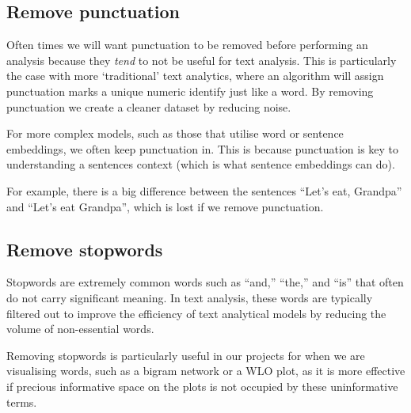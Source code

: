 \documentclass[
  letterpaper,
  DIV=11,
  numbers=noendperiod]{scrreprt}
\begin{document}
\subsection{Remove punctuation}\label{remove-punctuation}

Often times we will want punctuation to be removed before performing an
analysis because they \emph{tend} to not be useful for text analysis.
This is particularly the case with more `traditional' text analytics,
where an algorithm will assign punctuation marks a unique numeric
identify just like a word. By removing punctuation we create a cleaner
dataset by reducing noise.

\begin{tcolorbox}[enhanced jigsaw, opacitybacktitle=0.6, breakable, title=\textcolor{quarto-callout-tip-color}{\faLightbulb}\hspace{0.5em}{Warning on punctuation}, arc=.35mm, colframe=quarto-callout-tip-color-frame, colbacktitle=quarto-callout-tip-color!10!white, left=2mm, bottomrule=.15mm, opacityback=0, toprule=.15mm, bottomtitle=1mm, toptitle=1mm, titlerule=0mm, leftrule=.75mm, colback=white, rightrule=.15mm, coltitle=black]

For more complex models, such as those that utilise word or sentence
embeddings, we often keep punctuation in. This is because punctuation is
key to understanding a sentences context (which is what sentence
embeddings can do).

For example, there is a big difference between the sentences ``Let's
eat, Grandpa'' and ``Let's eat Grandpa'', which is lost if we remove
punctuation.

\end{tcolorbox}

\subsection{Remove stopwords}\label{remove-stopwords}

Stopwords are extremely common words such as ``and,'' ``the,'' and
``is'' that often do not carry significant meaning. In text analysis,
these words are typically filtered out to improve the efficiency of text
analytical models by reducing the volume of non-essential words.

Removing stopwords is particularly useful in our projects for when we
are visualising words, such as a bigram network or a WLO plot, as it is
more effective if precious informative space on the plots is not
occupied by these uninformative terms.
\end{document}
